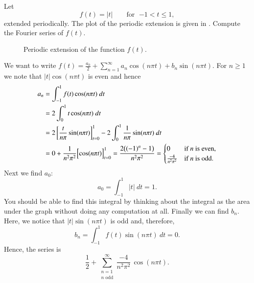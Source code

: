\documentclass[12pt]{book}
\begin{document}
\begin{example}
Let
\begin{equation*}
f(t) =
\lvert t \rvert
\qquad \text{for } \; {-1} < t \leq 1,
\end{equation*}
extended periodically.  The plot of the
periodic extension is given in .
Compute the Fourier series of $f(t)$.

\begin{figure}[h!t]
\capstart
\begin{center}
\caption{Periodic extension of the function $f(t)$.\label{gfs:sawcontfig}}
\end{center}
\end{figure}

We want to
write $f(t) = \frac{a_0}{2} + \sum_{n=1}^\infty a_n \cos (n \pi t) + b_n
\sin (n \pi t)$.  For $n \geq 1$ we note that $\lvert t \rvert \cos (n \pi t)$
is even and hence
\begin{equation*}
\begin{split}
a_n & = \int_{-1}^1 f(t) \cos (n \pi t) ~ dt \\
& = 2 \int_{0}^1 t \cos (n \pi t) ~ dt \\
 & = 2 \left[ \frac{t}{n \pi} \sin (n \pi t) \right]_{t=0}^1 -
2 \int_{0}^1 \frac{1}{n \pi} \sin (n \pi t) ~ dt \\
& =  0 + \frac{1}{n^2 \pi^2} \Bigl[ \cos (n \pi t) \Bigr]_{t=0}^1
 =  \frac{2 \bigl( {(-1)}^n -1 \bigr) }{n^2 \pi^2}
=
\begin{cases}
0 & \text{if } n \text{ is even} , \\
\frac{-4 }{n^2 \pi^2} & \text{if } n \text{ is odd}  .
\end{cases}
\end{split}
\end{equation*}
Next we find $a_0$:
\begin{equation*}
a_0 = \int_{-1}^1 \lvert t \rvert ~ dt 
=
1 .
\end{equation*}
You should be able to find this integral by thinking about the integral
as the area under the graph without doing any computation at all.
Finally we can find $b_n$.  Here, we notice that
$\lvert t \rvert \sin (n \pi t)$ is odd and, therefore,
\begin{equation*}
b_n = \int_{-1}^1 f(t) \sin (n \pi t) ~ dt = 0 .
\end{equation*}
Hence,
the series is 
\begin{equation*}
\frac{1}{2} + 
\sum_{\substack{n=1 \\ n \text{ odd}}}^\infty \frac{-4}{n^2 \pi^2} \, \cos (n \pi t) .
\end{equation*}


\end{example}
\end{document}
